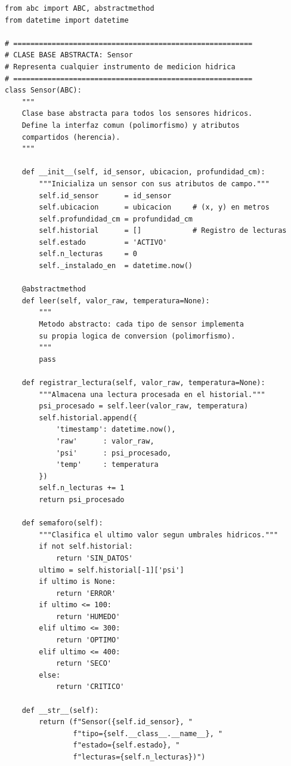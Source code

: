 \documentclass[12pt,a4paper]{article}
\begin{document}
\begin{lstlisting}[caption={Jerarquía de clases \texttt{Sensor} con herencia y polimorfismo.}, label=lst:poo1]
from abc import ABC, abstractmethod
from datetime import datetime

# ========================================================
# CLASE BASE ABSTRACTA: Sensor
# Representa cualquier instrumento de medicion hidrica
# ========================================================
class Sensor(ABC):
    """
    Clase base abstracta para todos los sensores hidricos.
    Define la interfaz comun (polimorfismo) y atributos 
    compartidos (herencia).
    """
    
    def __init__(self, id_sensor, ubicacion, profundidad_cm):
        """Inicializa un sensor con sus atributos de campo."""
        self.id_sensor      = id_sensor
        self.ubicacion      = ubicacion     # (x, y) en metros
        self.profundidad_cm = profundidad_cm
        self.historial      = []            # Registro de lecturas
        self.estado         = 'ACTIVO'
        self.n_lecturas     = 0
        self._instalado_en  = datetime.now()
    
    @abstractmethod
    def leer(self, valor_raw, temperatura=None):
        """
        Metodo abstracto: cada tipo de sensor implementa
        su propia logica de conversion (polimorfismo).
        """
        pass
    
    def registrar_lectura(self, valor_raw, temperatura=None):
        """Almacena una lectura procesada en el historial."""
        psi_procesado = self.leer(valor_raw, temperatura)
        self.historial.append({
            'timestamp': datetime.now(),
            'raw'      : valor_raw,
            'psi'      : psi_procesado,
            'temp'     : temperatura
        })
        self.n_lecturas += 1
        return psi_procesado
    
    def semaforo(self):
        """Clasifica el ultimo valor segun umbrales hidricos."""
        if not self.historial:
            return 'SIN_DATOS'
        ultimo = self.historial[-1]['psi']
        if ultimo is None:
            return 'ERROR'
        if ultimo <= 100:
            return 'HUMEDO'
        elif ultimo <= 300:
            return 'OPTIMO'
        elif ultimo <= 400:
            return 'SECO'
        else:
            return 'CRITICO'
    
    def __str__(self):
        return (f"Sensor({self.id_sensor}, "
                f"tipo={self.__class__.__name__}, "
                f"estado={self.estado}, "
                f"lecturas={self.n_lecturas})")



\end{lstlisting}
\end{document}
